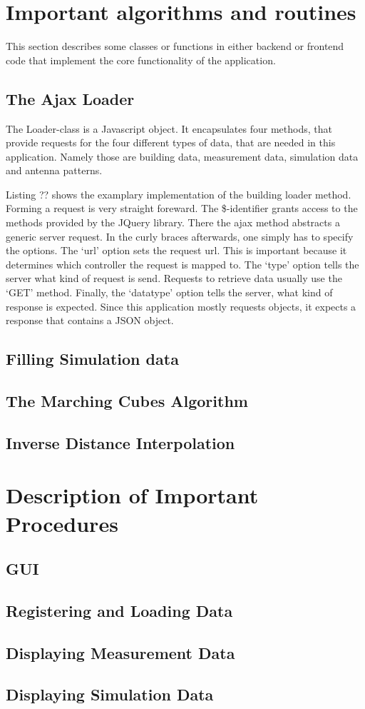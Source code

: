 \section{Important algorithms and routines}
This section describes some classes or functions in either backend or frontend code that implement the core functionality of the application.
\subsection{The Ajax Loader}
The Loader-class is a Javascript object. It encapsulates four methods, that provide requests for the four different types of data, that are needed in this application. Namely those are building data, measurement data, simulation data and antenna patterns.

Listing ?? shows the examplary implementation of the building loader method. Forming a request is very straight foreward. The \$-identifier grants access to the methods provided by the JQuery library. There the ajax method abstracts a generic server request. In the curly braces afterwards, one simply has to specify the options. The `url' option sets the request url. This is important because it determines which controller the request is mapped to. The  `type' option tells the server what kind of request is send. Requests to retrieve data usually use the `GET' method. Finally, the `datatype' option tells the server, what kind of response is expected. Since this application mostly requests objects, it expects a response that contains a JSON object.
\subsection{Filling Simulation data}
\subsection{The Marching Cubes Algorithm}
\subsection{Inverse Distance Interpolation}
\section{Description of Important Procedures}
\subsection{GUI}
\subsection{Registering and Loading Data}
\subsection{Displaying Measurement Data}
\subsection{Displaying Simulation Data}